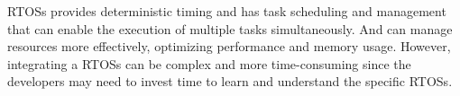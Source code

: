 \glspl{RTOS} provides deterministic timing and has task scheduling and management that can enable the execution of multiple tasks simultaneously.
And can manage resources more effectively, optimizing performance and memory usage.
However, integrating a \glspl{RTOS} can be complex and more time-consuming since the developers may need to invest time to learn and understand the specific \glspl{RTOS}.







